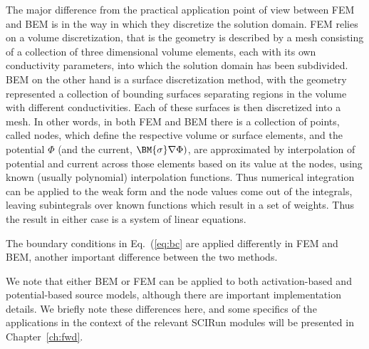 The major difference from the practical application point of view between
FEM and BEM is in the way in which they discretize the solution domain.
FEM relies on a volume discretization, that is the geometry is described by
a mesh consisting of a collection of three dimensional volume elements,
each with its own conductivity parameters, into which the solution domain
has been subdivided. BEM on the other hand is a surface discretization
method, with the geometry represented a collection of bounding surfaces
separating regions in the volume with different conductivities. Each of
these surfaces is then discretized into a mesh. In other words, in both FEM
and BEM there is a collection of points, called nodes, which define the
respective volume or surface elements, and the potential $\Phi$ (and the
current, $\BM{\sigma} \nabla \Phi)$, are approximated by interpolation of
potential and current across those elements based on its value at the
nodes, using known (usually polynomial) interpolation functions. Thus
numerical integration can be applied to the weak form and the node values
come out of the integrals, leaving subintegrals over known functions which
result in a set of weights. Thus the result in either case is a system of
linear equations. 

The boundary conditions in Eq.~(\ref{eq:bc} are applied differently  in FEM
and BEM, another important difference between the two methods.



We note that either BEM or FEM can be applied to both activation-based and
potential-based source models, although there are important implementation
details. We briefly note these differences here, and some specifics of the
applications in the context of the relevant SCIRun modules will be
presented in Chapter~\ref{ch:fwd}.



